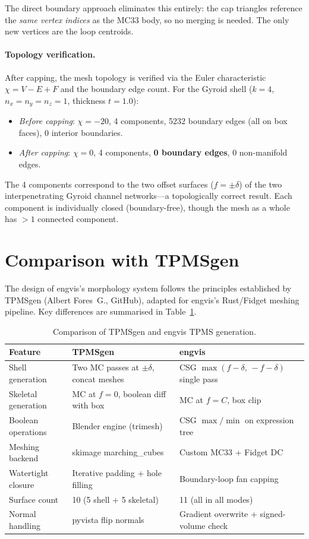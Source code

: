 \documentclass[11pt]{article}
\begin{document}
The direct boundary approach eliminates this entirely: the cap
triangles reference the \emph{same vertex indices} as the MC33 body,
so no merging is needed.  The only new vertices are the loop
centroids.

\paragraph{Topology verification.}
After capping, the mesh topology is verified via the Euler
characteristic $\chi = V - E + F$ and the boundary edge count.
For the Gyroid shell ($k=4$, $n_x=n_y=n_z=1$, thickness $t=1.0$):
\begin{itemize}[leftmargin=2em]
  \item \emph{Before capping}: $\chi = -20$, 4 components,
    5232 boundary edges (all on box faces), 0 interior boundaries.
  \item \emph{After capping}: $\chi = 0$, 4 components,
    \textbf{0 boundary edges}, 0 non-manifold edges.
\end{itemize}
The 4 components correspond to the two offset surfaces ($f = \pm\delta$)
of the two interpenetrating Gyroid channel networks---a topologically
correct result.  Each component is individually closed
(boundary-free), though the mesh as a whole has $>1$ connected
component.

\section{Comparison with TPMSgen}

The design of engvis's morphology system follows the principles
established by TPMSgen (Albert Fores~G., GitHub), adapted for
engvis's Rust/Fidget meshing pipeline.  Key differences are summarised
in Table~\ref{tab:comparison}.

\begin{table}[h]
\centering
\caption{Comparison of TPMSgen and engvis TPMS generation.}
\label{tab:comparison}
\begin{tabular}{lp{4.5cm}p{4.5cm}}
\toprule
\textbf{Feature} & \textbf{TPMSgen} & \textbf{engvis} \\
\midrule
Shell generation & Two MC passes at $\pm\delta$, concat meshes & CSG $\max(f-\delta,\,-f-\delta)$ single pass \\
Skeletal generation & MC at $f=0$, boolean diff with box & MC at $f=C$, box clip \\
Boolean operations & Blender engine (trimesh) & CSG $\max/\min$ on expression tree \\
Meshing backend & skimage marching\_cubes & Custom MC33 + Fidget DC \\
Watertight closure & Iterative padding + hole filling & Boundary-loop fan capping \\
Surface count & 10 (5 shell + 5 skeletal) & 11 (all in all modes) \\
Normal handling & pyvista flip normals & Gradient overwrite + signed-volume check \\
\bottomrule
\end{tabular}
\end{table}
\end{document}
